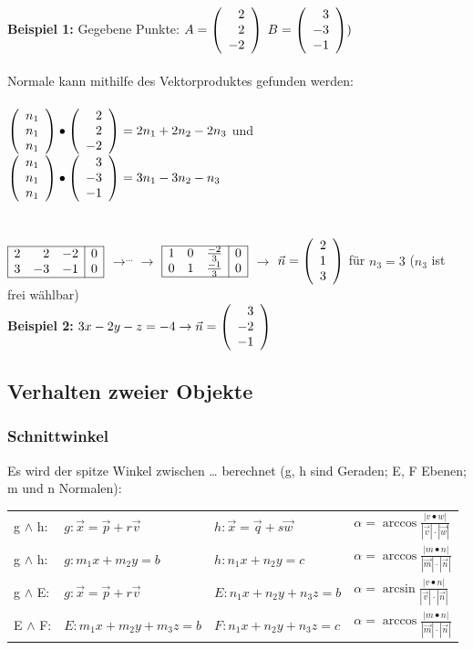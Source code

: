 		\textbf{Beispiel 1:} Gegebene Punkte: $A=\left(\begin{array}{r} 2 \\ 2 \\ -2 \\ \end{array}\right)$
									 $B=\left(\begin{array}{r} 3 \\ -3 \\ -1 \\ \end{array}\right))$ \\ \ \\
							 Normale kann mithilfe des Vektorproduktes gefunden werden: \\ \ \\
									 $\left(\begin{array}{r} n_1 \\ n_1 \\ n_1 \\ \end{array}\right)\bullet\left(\begin{array}{r} 2 \\ 2 \\ -2 \\ \end{array}\right)=2n_1+2n_2-2n_3$ und
									 $\left(\begin{array}{r} n_1 \\ n_1 \\ n_1 \\ \end{array}\right)\bullet\left(\begin{array}{r} 3 \\ -3 \\ -1 \\ \end{array}\right)=3n_1-3n_2-n_3$\\ \ \\ \ \\
							$\begin{array}{|rrr|r|}
								\hline 
									2 & 2 & -2 & 0 \\
									3 & -3 & -1 & 0 \\
								\hline
							\end{array}$
							$\rightarrow^{...}\rightarrow$	
							$\begin{array}{|rrr|r|}
								\hline 
									1 & 0 & \frac{-2}{3} & 0 \\
									0 & 1 & \frac{-1}{3} & 0 \\
								\hline
							\end{array}$
							$\rightarrow$
							$\vec{n}=\left(\begin{array}{r} 2 \\ 1 \\ 3 \\ \end{array}\right)$ für $n_3 = 3$ ($n_3$ ist frei wählbar)\\
	 \textbf{Beispiel 2:} $3x-2y-z=-4\rightarrow\vec{n}=\left(\begin{array}{r} 3 \\ -2 \\ -1 \\ \end{array}\right)$
		
\subsection{Verhalten zweier Objekte}
	\subsubsection{Schnittwinkel}
		Es wird der spitze Winkel zwischen \ldots{ }berechnet (g, h sind Geraden; E, F Ebenen; m und n Normalen):\\
		\begin{tabular}{llll}
		g $\wedge$ h:
		&$g: \vec{x}=\vec{p}+r\vec{v}$ 
		&$h: \vec{x}=\vec{q}+s\vec{w}$ 
		&$\alpha=\arccos{\frac{|v\bullet w|}{|\vec{v}|\cdot|\vec{w}|}}$\\
		g $\wedge$ h:
		&$g: m_1x+m_2y=b$
		&$h: n_1x+n_2y=c$
		&$\alpha=\arccos{\frac{|m\bullet n|}{|\vec{m}|\cdot|\vec{n}|}}$\\
		g $\wedge$ E:
		&$g: \vec{x}=\vec{p}+r\vec{v}$
		&$E: n_1x+n_2y+n_3z=b$
		&$\alpha=\arcsin{\frac{|v\bullet n|}{|\vec{v}|\cdot|\vec{n}|}}$\\
		E $\wedge$ F:
		&$E: m_1x+m_2y+m_3z=b$
		&$F: n_1x+n_2y+n_3z=c$
		&$\alpha=\arccos{\frac{|m\bullet n|}{|\vec{m}|\cdot|\vec{n}|}}$\\
		\end{tabular}

